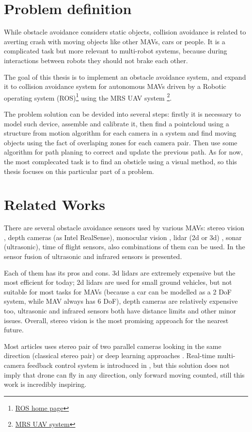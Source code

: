 \section{Problem definition}
While obstacle avoidance considers static objects, collision avoidance is related to averting crash with moving objects like other MAVs, cars or people. It is a complicated task but more relevant to multi-robot systems, because during interactions between robots they should not brake each other. 

The goal of this thesis is to implement an obstacle avoidance system, and expand it to collision avoidance system for autonomous MAVs driven by a Robotic operating system (ROS)\footnote{\href{https://www.ros.org/}{ROS home page}} using the MRS UAV system \cite{Baca2021} \footnote{\href{https://github.com/ctu-mrs/mrs_uav_system}{MRS UAV system}}.

The problem solution can be devided into several steps: firstly it is necessary to model such device, assemble and calibrate it, then find a pointcloud using a structure from motion algorithm for each camera in a system and find moving objects using the fact of overlaping zones for each camera pair. Then use some algorithm for path planing to correct and update the previous path. As for now, the most complecated task is to find an obsticle using a visual method, so this thesis focuses on this particular part of a problem.

\section{Related Works}

There are several obstacle avoidance sensors used by various MAVs: stereo vision \cite{Ruf2018}, depth cameras (as Intel RealSense), monocular vision \cite{Mejias2010}, lidar (2d or 3d) \cite{Ramasamy2016}, sonar (ultrasonic), time of flight sensors, also combinations of them can be used. In \cite{Rambabu2015} the sensor fusion of ultrasonic and infrared sensors is presented.

Each of them has its pros and cons. 3d lidars are extremely expensive but the most efficient for today; 2d lidars are used for small ground vehicles, but not suitable for most tasks for MAVs (because a car can be modelled as a 2 DoF system, while MAV always has 6 DoF), depth cameras are relatively expensive too, ultrasonic and infrared sensors both have distance limits and other minor issues. Overall, stereo vision is the most promising approach for the nearest future.

Most articles uses stereo pair of two parallel cameras looking in the same direction (classical stereo pair) \cite{Yu2018, Lin2021, Xiao2019} or deep learning approaches \cite{Back2020, FragaLamas2019, Park2020, Roghair2021}. Real-time multi-camera feedback control system is introduced in \cite{He2021}, but this solution does not imply that drone can fly in any direction, only forward moving counted, still this work is incredibly inspiring.
